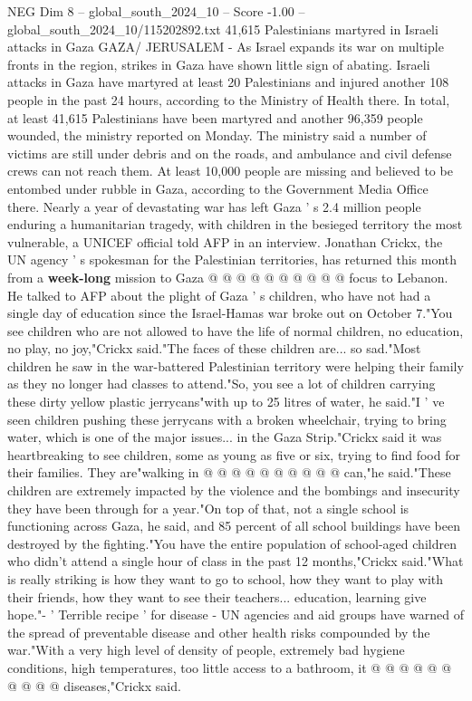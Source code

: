 \begin{textsample}{NEG Dim 8 – global\_south\_2024\_10 – Score -1.00 – global\_south\_2024\_10/115202892.txt}  \label{ex:f8_neg_140}
41,615 Palestinians martyred in Israeli attacks in Gaza GAZA/ JERUSALEM - As Israel expands its war on multiple fronts in the region, strikes in Gaza have shown little sign of abating.
Israeli attacks in Gaza have martyred at least 20 Palestinians and injured another 108 people in the past 24 hours, according to the Ministry of Health there.
In total, at least 41,615 Palestinians have been martyred and another 96,359 people wounded, the ministry reported on Monday.
The ministry said a number of victims are still under debris and on the roads, and ambulance and civil defense crews can not reach them.
At least 10,000 people are missing and believed to be entombed under rubble in Gaza, according to the Government Media Office there.
Nearly a year of devastating war has left Gaza ' s 2.4 million people enduring a humanitarian tragedy, with children in the besieged territory the most vulnerable, a UNICEF official told AFP in an interview.
Jonathan Crickx, the UN agency ' s spokesman for the Palestinian territories, has returned this month from a \textbf{week-long} mission to Gaza @ @ @ @ @ @ @ @ @ @ focus to Lebanon.
He talked to AFP about the plight of Gaza ' s children, who have not had a single day of education since the Israel-Hamas war broke out on October 7."You see children who are not allowed to have the life of normal children, no education, no play, no joy,"Crickx said."The faces of these children are... so sad."Most children he saw in the war-battered Palestinian territory were helping their family as they no longer had classes to attend."So, you see a lot of children carrying these dirty yellow plastic jerrycans"with up to 25 litres of water, he said."I ' ve seen children pushing these jerrycans with a broken wheelchair, trying to bring water, which is one of the major issues... in the Gaza Strip."Crickx said it was heartbreaking to see children, some as young as five or six, trying to find food for their families.
They are"walking in @ @ @ @ @ @ @ @ @ @ can,"he said."These children are extremely impacted by the violence and the bombings and insecurity they have been through for a year."On top of that, not a single school is functioning across Gaza, he said, and 85 percent of all school buildings have been destroyed by the fighting."You have the entire population of school-aged children who didn't attend a single hour of class in the past 12 months,"Crickx said."What is really striking is how they want to go to school, how they want to play with their friends, how they want to see their teachers... education, learning give hope."- ' Terrible recipe ' for disease - UN agencies and aid groups have warned of the spread of preventable disease and other health risks compounded by the war."With a very high level of density of people, extremely bad hygiene conditions, high temperatures, too little access to a bathroom, it @ @ @ @ @ @ @ @ @ @ diseases,"Crickx said.

\end{textsample}

